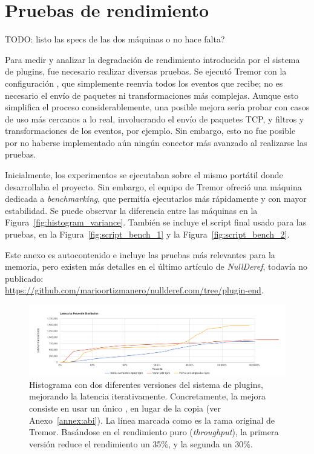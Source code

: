 \chapter{Pruebas de rendimiento}\label{annex:benchmarks}

TODO: listo las specs de las dos máquinas o no hace falta?

Para medir y analizar la degradación de rendimiento introducida por el sistema
de plugins, fue necesario realizar diversas pruebas. Se ejecutó Tremor con la
configuración , que simplemente reenvía todos los eventos que
recibe; no es necesario el envío de paquetes ni transformaciones más complejas.
Aunque esto simplifica el proceso considerablemente, una posible mejora sería
probar con casos de uso más cercanos a lo real, involucrando el envío de
paquetes TCP, y filtros y transformaciones de los eventos, por ejemplo. Sin
embargo, esto no fue posible por no haberse implementado aún ningún conector más
avanzado al realizarse las pruebas.

Inicialmente, los experimentos se ejecutaban sobre el mismo portátil donde
desarrollaba el proyecto. Sin embargo, el equipo de Tremor ofreció una máquina
dedicada a \emph{benchmarking}, que permitía ejecutarlos más rápidamente y con
mayor estabilidad. Se puede observar la diferencia entre las máquinas en la
Figura~\ref{fig:histogram_variance}. También se incluye el script final usado
para las pruebas, en la Figura~\ref{fig:script_bench_1} y la
Figura~\ref{fig:script_bench_2}.

Este anexo es autocontenido e incluye las pruebas más relevantes para la
memoria, pero existen más detalles en el último artículo de \emph{NullDeref},
todavía no publicado:\\
\url{https://github.com/marioortizmanero/nullderef.com/tree/plugin-end}.

\begin{figure}
    \centering
    \includegraphics[width=\textwidth]{./Imagenes/histogram_pdk.png}
    \caption{Histograma con dos diferentes versiones del sistema de plugins,
    mejorando la latencia iterativamente. Concretamente, la mejora consiste en
    usar un único , en lugar de la copia  (ver
    Anexo~\ref{annex:abi}). La línea marcada como
     es la rama original de Tremor. Basándose en
    el rendimiento puro (\emph{throughput}), la primera versión reduce el
    rendimiento un 35\%, y la segunda un 30\%.}%
    \label{fig:histogram_pdk}
\end{figure}

